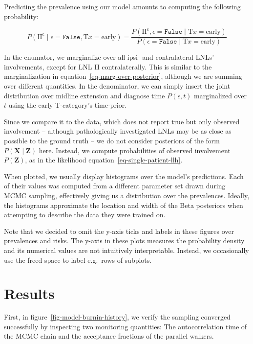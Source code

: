 \documentclass[
  sn-mathphys-num,
]{sn-jnl}
\begin{document}
Predicting the prevalence using our model amounts to computing the
following probability:

\[
P \left( \text{II}^\text{c} \mid \epsilon=\texttt{False}, \text{T}x=\text{early} \right) = \frac{P \left( \text{II}^\text{c}, \epsilon=\texttt{False} \mid \text{T}x=\text{early} \right)}{P \left( \epsilon=\texttt{False} \mid \text{T}x=\text{early} \right)}
\]

In the enumator, we marginalize over all ipsi- and contralateral LNLs'
involvements, except for LNL II contralaterally. This is similar to the
marginalization in equation~\ref{eq-marg-over-posterior}, although we
are summing over different quantities. In the denominator, we can simply
insert the joint distribution over midline extension and diagnose time
\(P \left( \epsilon, t \right)\) marginalized over \(t\) using the early
T-category's time-prior.

Since we compare it to the data, which does not report true but only
observed involvement -- although pathologically investigated LNLs may be
as close as possible to the ground truth -- we do not consider
posteriors of the form \(P \left( \mathbf{X} \mid \mathbf{Z} \right)\)
here. Instead, we compute probabilities of observed involvement
\(P \left( \mathbf{Z} \right)\), as in the likelihood
equation~\ref{eq-single-patient-llh}.

When plotted, we usually display histograms over the model's
predictions. Each of their values was computed from a different
parameter set drawn during MCMC sampling, effectively giving us a
distribution over the prevalences. Ideally, the histograms approximate
the location and width of the Beta posteriors when attempting to
describe the data they were trained on.

Note that we decided to omit the y-axis ticks and labels in these
figures over prevalences and risks. The y-axis in these plots measures
the probability density and its numerical values are not intuitively
interpretable. Instead, we occasionally use the freed space to label
e.g.~rows of subplots.

\section{Results}\label{sec-results}

First, in figure~\ref{fig-model-burnin-history}, we verify the sampling
converged successfully by inspecting two monitoring quantities: The
autocorrelation time of the MCMC chain and the acceptance fractions of
the parallel walkers.
\end{document}
